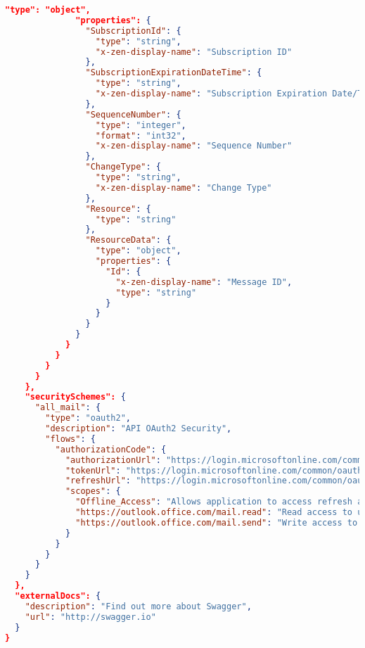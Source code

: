 \begin{lstlisting}[language=json,basicstyle=\ttfamily\tiny,numberstyle=\tiny]
              "type": "object",
              "properties": {
                "SubscriptionId": {
                  "type": "string",
                  "x-zen-display-name": "Subscription ID"
                },
                "SubscriptionExpirationDateTime": {
                  "type": "string",
                  "x-zen-display-name": "Subscription Expiration Date/Time"
                },
                "SequenceNumber": {
                  "type": "integer",
                  "format": "int32",
                  "x-zen-display-name": "Sequence Number"
                },
                "ChangeType": {
                  "type": "string",
                  "x-zen-display-name": "Change Type"
                },
                "Resource": {
                  "type": "string"
                },
                "ResourceData": {
                  "type": "object",
                  "properties": {
                    "Id": {
                      "x-zen-display-name": "Message ID",
                      "type": "string"
                    }
                  }
                }
              }
            }
          }
        }
      }
    },
    "securitySchemes": {
      "all_mail": {
        "type": "oauth2",
        "description": "API OAuth2 Security",
        "flows": {
          "authorizationCode": {
            "authorizationUrl": "https://login.microsoftonline.com/common/oauth2/v2.0/authorize",
            "tokenUrl": "https://login.microsoftonline.com/common/oauth2/v2.0/token",
            "refreshUrl": "https://login.microsoftonline.com/common/oauth2/v2.0/token",
            "scopes": {
              "Offline_Access": "Allows application to access refresh access token on behalf of user",
              "https://outlook.office.com/mail.read": "Read access to user emails",
              "https://outlook.office.com/mail.send": "Write access to user emails"
            }
          }
        }
      }
    }
  },
  "externalDocs": {
    "description": "Find out more about Swagger",
    "url": "http://swagger.io"
  }
}
\end{lstlisting}
